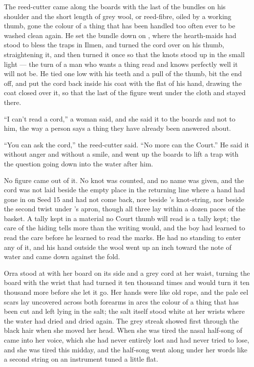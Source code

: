 The reed-cutter came along the boards with the last of the bundles on his shoulder and the short length of grey wool, or reed-fibre, oiled by a working thumb, gone the colour of a thing that has been handled too often ever to be washed clean again. He set the bundle down on , where the hearth-maids had stood to bless the traps in Ilmen, and turned the cord over on his thumb, straightening it, and then turned it once so that the knots stood up in the small light --- the turn of a man who wants a thing read and knows perfectly well it will not be. He tied one low with his teeth and a pull of the thumb, bit the end off, and put the cord back inside his coat with the flat of his hand, drawing the coat closed over it, so that the last of the figure went under the cloth and stayed there.

“I can't read a cord,” a woman said, and she said it to the boards and not to him, the way a person says a thing they have already been answered about.

“You can ask the cord,” the reed-cutter said. “No more can the Court.” He said it without anger and without a smile, and went up the boards to lift a trap with the question going down into the water after him.

No figure came out of it. No knot was counted, and no name was given, and the cord was not laid beside the empty place in the returning line where a hand had gone in on Seed 15 and had not come back, nor beside 's knot-string, nor beside the second twist under 's apron, though all three lay within a dozen paces of the basket. A tally kept in a material no Court thumb will read is a tally kept; the care of the hiding tells more than the writing would, and the boy had learned to read the care before he learned to read the marks. He had no standing to enter any of it, and his hand outside the wool went up an inch toward the note of water and came down against the fold.

\scenebreak

Orra stood at  with her board on its side and a grey cord at her waist, turning the board with the wrist that had turned it ten thousand times and would turn it ten thousand more before she let it go. Her hands were like old rope, and the pale eel scars lay uncovered across both forearms in arcs the colour of a thing that has been cut and left lying in the salt; the salt itself stood white at her wrists where the water had dried and dried again. The grey streak showed first through the black hair when she moved her head. When she was tired the nasal half-song of  came into her voice, which she had never entirely lost and had never tried to lose, and she was tired this midday, and the half-song went along under her words like a second string on an instrument tuned a little flat.


